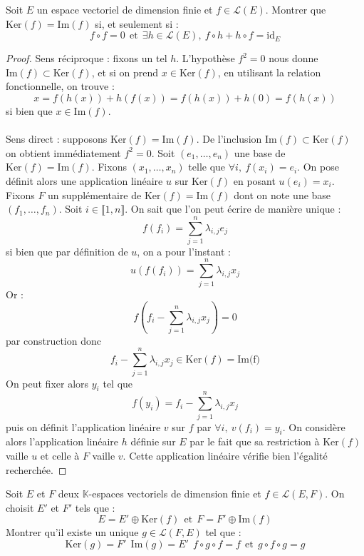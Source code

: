 \documentclass[french,a4paper]{article}
\newcommand{\K}{\mathbb{K}}
\renewcommand{\ker}{\text{Ker}}
\theoremstyle{plain}
\theoremstyle{definition}
\theoremstyle{remark}
\begin{document}
\begin{ex}[Moulin.EV.38]{}
	Soit $E$ un espace vectoriel de dimension finie et $f\in\mathcal{L}(E)$. Montrer que $\ker(f)=\text{Im}(f)$ si, et seulement si : $$f\circ f=0\ \ \text{et}\ \ \exists h\in\mathcal{L}(E),\ f\circ h+h\circ f=\text{id}_E$$
\end{ex}
\begin{proof}
	Sens réciproque : fixons un tel $h$. L'hypothèse $f^2=0$ nous donne $\text{Im}(f)\subset\ker(f)$, et si on prend $x\in\ker(f)$, en utilisant la relation fonctionnelle, on trouve : $$x=f(h(x))+h(f(x))=f(h(x))+h(0)=f(h(x))$$ si bien que $x\in\text{Im}(f)$.\\ \\
	Sens direct : supposons $\ker(f)=\text{Im}(f)$. De l'inclusion $\text{Im}(f)\subset\ker(f)$ on obtient immédiatement $f^2=0$. Soit $(e_1,\ldots,e_n)$ une base de $\ker(f)=\text{Im}(f)$. Fixons $(x_1,\ldots,x_n)$ telle que $\forall i,\ f(x_i)=e_i$. On pose définit alors une application linéaire $u$ sur $\ker(f)$ en posant $u(e_i)=x_i$. Fixons $F$ un supplémentaire de $\ker(f)=\text{Im}(f)$ dont on note une base $(f_1,\ldots,f_n)$. Soit $i\in\llbracket1,n\rrbracket$. On sait que l'on peut écrire de manière unique : $$f(f_i)=\sum_{j=1}^{n}\lambda_{i,j}e_j$$ si bien que par définition de $u$, on a pour l'instant : $$u(f(f_i))=\sum_{j=1}^{n}\lambda_{i,j}x_j$$
	Or : $$f\left(f_i-\sum_{j=1}^{n}\lambda_{i,j}x_j\right)=0$$ par construction donc $$f_i-\sum_{j=1}^{n}\lambda_{i,j}x_j\in\ker(f)=\text{Im(f)}$$ On peut fixer alors $y_i$ tel que $$f(y_i)=f_i-\sum_{j=1}^{n}\lambda_{i,j}x_j$$ puis on définit l'application linéaire $v$ sur $f$ par $\forall i,\ v(f_i)=y_i$. On considère alors l'application linéaire $h$ définie sur $E$ par le fait que sa restriction à $\ker(f)$ vaille $u$ et celle à $F$ vaille $v$. Cette application linéaire vérifie bien l'égalité recherchée.
\end{proof}

\begin{ex}[Moulin.EV.39]{}
	Soit $E$ et $F$ deux $\K$-espaces vectoriels de dimension finie et $f\in\mathcal{L}(E,F)$. On choisit $E'$ et $F'$ tels que : $$E=E'\oplus\ker(f)\ \ \text{et}\ \ F=F'\oplus\text{Im}(f)$$ Montrer qu'il existe un unique $g\in\mathcal{L}(F,E)$ tel que : $$\ker(g)=F'\ \ \text{Im}(g)=E'\ \ f\circ g\circ f=f\ \ \text{et}\ \ g\circ f\circ g=g$$
\end{ex}
\end{document}
